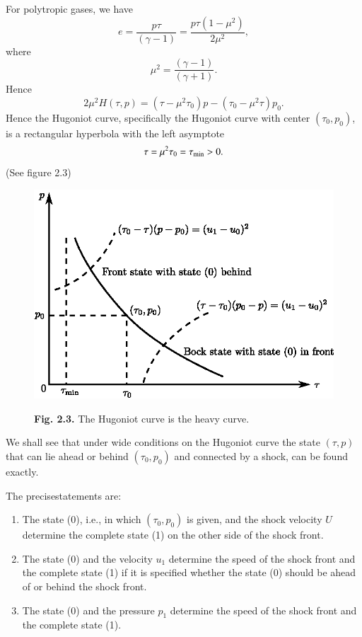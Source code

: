 For polytropic gases, we have 
$$
e = \frac{p\tau}{(\gamma -1)} = \frac{p\tau (1-\mu^2)}{2\mu^2},
$$
where\pageoriginale
$$
\mu^2 = \frac{(\gamma -1)}{(\gamma + 1)}. 
$$
Hence
$$
2\mu^2 H(\tau, p) = (\tau - \mu^2 \tau_0) p - (\tau_0 - \mu^2 \tau) p_0.
$$
Hence the Hugoniot curve, specifically the Hugoniot curve with center $(\tau_0, p_0)$, is a rectangular hyperbola with the left asymptote
$$
\tau = \mu^2 \tau_0= \tau_{\rm min} > 0.
$$
(See figure 2.3)
\begin{figure}[H]
\centering
\includegraphics{figures/fig2.3.eps}
\centerline{\textbf{Fig. 2.3.} The Hugoniot curve is the heavy curve.}
\end{figure}

We shall see that under wide conditions on the Hugoniot curve the state $(\tau, p)$ that can lie ahead or behind $(\tau_0, p_0)$ and connected by a shock, can be found exactly.

The precise\pageoriginale statements are:
\begin{enumerate}
\item The state (0), i.e., in which $(\tau_0, p_0)$ is given, and the shock velocity $U$ determine the complete state (1) on the other side of the shock front.

\item The state (0) and the velocity $u_1$ determine the speed of the shock front and the complete state (1) if it is specified whether the state (0) should be ahead of or behind the shock front.

\item The state (0) and the pressure $p_1$ determine the speed of the shock front and the complete state (1).
\end{enumerate}

